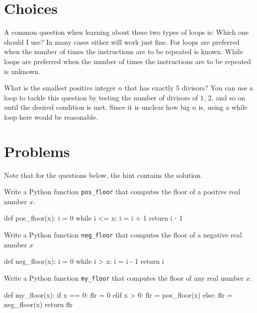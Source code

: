 \documentclass{ximera}
\begin{document}
\section{Choices}

A common question when learning about these two types of loops is: Which one should I use? In many cases either will work just fine. For loops are preferred when the number of times the instructions are to be repeated is known. While loops are preferred when the number of times the instructions are to be repeated is unknown.

What is the smallest positive integer $n$ that has exactly $5$ divisors? You can use a loop to tackle this question by testing the number of divisors of $1$, $2$, and so on until the desired condition is met. Since it is unclear how big $n$ is, using a while loop here would be reasonable.

\section{Problems}

Note that for the questions below, the hint contains the solution.

\begin{question}
	Write a Python function \verb|pos_floor| that computes the floor of a positive real number $x$.
\begin{hint}
\begin{sageCell}
def pos_floor(x):
        i = 0
        while i <= x:
                i = i + 1
        return i - 1
\end{sageCell}
\end{hint}
\end{question}

\begin{question}
	Write a Python function \verb|neg_floor| that computes the floor of a negative real number $x$
\begin{hint}
\begin{sageCell}
def neg_floor(x):
        i = 0
        while i > x:
                i = i - 1
        return i
\end{sageCell}
\end{hint}
\end{question}

\begin{question}
	Write a Python function \verb|my_floor| that computes the floor of any real number $x$.
\begin{hint}
\begin{sageCell}
def my_floor(x):
        if x == 0:
                flr = 0
        elif x > 0:
                flr = pos_floor(x)
        else:
                flr = neg_floor(x)
        return flr
\end{sageCell}
\end{hint}
\end{question}
\end{document}
